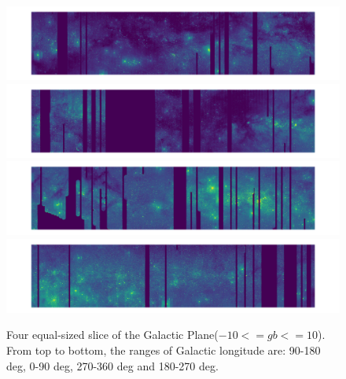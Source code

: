 \documentclass[12pt, preprint]{aastex}
\begin{document}
\begin{figure}[p]
\begin{center}
\includegraphics[width=1.\textwidth]{figures/cartview1}
\includegraphics[width=1.\textwidth]{figures/cartview2}
\includegraphics[width=1.\textwidth]{figures/cartview3}
\includegraphics[width=1.\textwidth]{figures/cartview4}
\end{center}
\caption{
  \label{map0}
  Four equal-sized slice of the Galactic Plane($-10<=gb<=10$).
  From top to bottom, the ranges of Galactic longitude are: 90-180 deg, 0-90 deg, 270-360 deg and 180-270 deg.
}
\end{figure}
\end{document}
